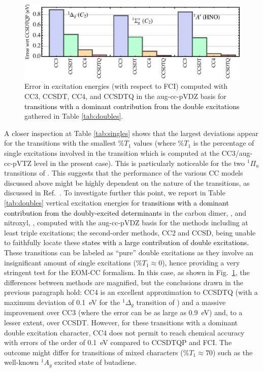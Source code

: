 \documentclass[aip,jcp,reprint,noshowkeys,superscriptaddress]{revtex4-1}
\newcommand{\alert}[1]{\textcolor{black}{#1}}
\begin{document}
\begin{figure}
	\includegraphics[width=0.7\linewidth]{fig2}
	\caption{
	Error in excitation energies (with respect to FCI) computed with CC3, CCSDT, CC4, and CCSDTQ in the aug-cc-pVDZ basis
	for \alert{transitions with a dominant contribution from the double excitations} gathered in Table \ref{tab:doubles}.
	\label{fig:doubles}}
\end{figure}

A closer inspection at Table \ref{tab:singles} shows that the largest deviations appear for the transitions with the smallest $\%T_1$ values (where $\%T_1$ is the percentage of single excitations involved in the transition which is computed at the CC3/aug-cc-pVTZ level in the present case). 
This is particularly noticeable for the two $^1\Pi_u$ transitions of .
This suggests that the performance of the various CC models discussed above might be highly dependent on the nature of the transitions, as discussed in Ref.~.
To investigate further this point, we report in Table \ref{tab:doubles} vertical excitation energies for \alert{transitions with a dominant contribution from the doubly-excited determinants} in the carbon dimer, , and nitroxyl, , computed with the aug-cc-pVDZ basis for the methods including at least triple excitations; the second-order methods, CC2 and CCSD, being unable to faithfully locate these \alert{states with a large contribution of double excitations.}
These transitions can be labeled as ``pure'' double excitations as they involve an insignificant amount of single excitations ($\%T_1 \approx 0$), hence providing a very stringent test for the EOM-CC formalism.
In this case, as shown in Fig.~\ref{fig:doubles}, the differences between methods are magnified, but the conclusions drawn in the previous paragraph hold: CC4 is an excellent approximation to CCSDTQ (with a maximum deviation of \SI{0.1}{\eV} for the $^1\Delta_g$ transition of ) and a massive improvement over CC3 (where the error can be as large as \SI{0.9}{\eV}) and, to a lesser extent, over CCSDT.
However, for these transitions with a dominant double excitation character, CC4 does not permit to reach chemical accuracy with errors of the order of \SI{0.1}{\eV} compared to CCSDTQP and FCI.
The outcome might differ for transitions of mixed characters ($\%T_1 \approx 70$) such as the well-known $^1 A_g$ excited state of butadiene.\cite{Maitra_2004,Saha_2006,Watson_2012,Shu_2017,Barca_2018a,Loos_2019} 
\end{document}
